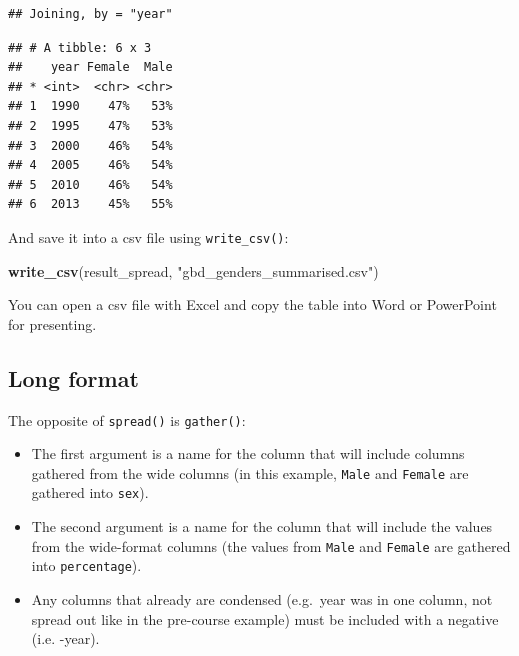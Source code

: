 \documentclass[]{book}
\makeatletter
\newenvironment{Shaded}{\begin{snugshade}}{\end{snugshade}}
\newcommand{\KeywordTok}[1]{\textcolor[rgb]{0.13,0.29,0.53}{\textbf{#1}}}
\newcommand{\DataTypeTok}[1]{\textcolor[rgb]{0.13,0.29,0.53}{#1}}
\newcommand{\DecValTok}[1]{\textcolor[rgb]{0.00,0.00,0.81}{#1}}
\newcommand{\StringTok}[1]{\textcolor[rgb]{0.31,0.60,0.02}{#1}}
\newcommand{\OperatorTok}[1]{\textcolor[rgb]{0.81,0.36,0.00}{\textbf{#1}}}
\newcommand{\NormalTok}[1]{#1}
\providecommand{\tightlist}{%
  \setlength{\itemsep}{0pt}\setlength{\parskip}{0pt}}
\newenvironment{kframe}{%
\medskip{}
\setlength{\fboxsep}{.8em}
 \def\at@end@of@kframe{}%
 \ifinner\ifhmode%
  \def\at@end@of@kframe{\end{minipage}}%
  \begin{minipage}{\columnwidth}%
 \fi\fi%
 \def\FrameCommand##1{\hskip\@totalleftmargin \hskip-\fboxsep
 \colorbox{shadecolor}{##1}\hskip-\fboxsep
     \hskip-\linewidth \hskip-\@totalleftmargin \hskip\columnwidth}%
 \MakeFramed {\advance\hsize-\width
   \@totalleftmargin\z@ \linewidth\hsize
   \@setminipage}}%
 {\par\unskip\endMakeFramed%
 \at@end@of@kframe}
\renewenvironment{Shaded}{\begin{kframe}}{\end{kframe}}
\makeatother
\begin{document}
\begin{verbatim}
## Joining, by = "year"
\end{verbatim}

\begin{Shaded}
\end{Shaded}

\begin{verbatim}
## # A tibble: 6 x 3
##    year Female  Male
## * <int>  <chr> <chr>
## 1  1990    47%   53%
## 2  1995    47%   53%
## 3  2000    46%   54%
## 4  2005    46%   54%
## 5  2010    46%   54%
## 6  2013    45%   55%
\end{verbatim}

And save it into a csv file using \texttt{write\_csv()}:

\begin{Shaded}
\begin{Highlighting}[]
\KeywordTok{write_csv}\NormalTok{(result_spread, }\StringTok{"gbd_genders_summarised.csv"}\NormalTok{)}
\end{Highlighting}
\end{Shaded}

You can open a csv file with Excel and copy the table into Word or
PowerPoint for presenting.

\subsection{Long format}\label{long-format}

The opposite of \texttt{spread()} is \texttt{gather()}:

\begin{itemize}
\tightlist
\item
  The first argument is a name for the column that will include columns
  gathered from the wide columns (in this example, \texttt{Male} and
  \texttt{Female} are gathered into \texttt{sex}).
\item
  The second argument is a name for the column that will include the
  values from the wide-format columns (the values from \texttt{Male} and
  \texttt{Female} are gathered into \texttt{percentage}).
\item
  Any columns that already are condensed (e.g.~year was in one column,
  not spread out like in the pre-course example) must be included with a
  negative (i.e. -year).
\end{itemize}
\end{document}

